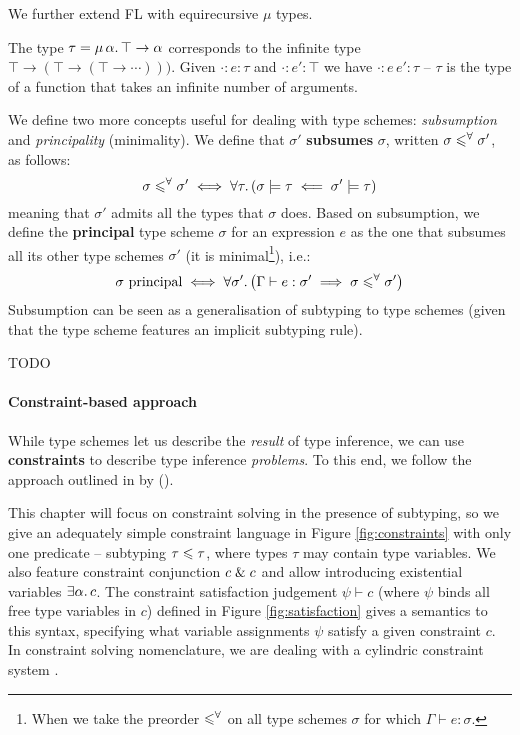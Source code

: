 \begin{example}
    We further extend FL with equirecursive $\mu$ types. 
    
    The type $\tau = \mu\,{\alpha}\ldotp \top \to \alpha$ corresponds to the infinite type $\top \to (\top \to (\top \to \cdots)))$. Given $\cdot : e : \tau$ and $\cdot : e' : \top$ we have $\cdot : e\,e' : \tau$ -- $\tau$ is the type of a function that takes an infinite number of arguments.
\end{example}

We define two more concepts useful for dealing with type schemes: \emph{subsumption} and \emph{principality} (minimality). We define that $\sigma'$ \textbf{subsumes} $\sigma$, written $\sigma \leqslant^\forall \sigma'$, as follows:
$$ \sigma \leqslant^\forall \sigma' \iff \forall \tau \ldotp (\sigma \models \tau \impliedby \sigma' \models \tau) $$
meaning that $\sigma'$ admits all the types that $\sigma$ does.
Based on subsumption, we define the \textbf{principal} type scheme $\sigma$ for an expression $e$ as the one that subsumes all its other type schemes $\sigma'$ (it is minimal\footnote{When we take the preorder $\leqslant^\forall$ on all type schemes $\sigma$ for which $\Gamma \vdash e : \sigma$.}), i.e.\@:
$$ \sigma\text{ principal} \iff \forall \sigma' \ldotp \left( \Gamma \vdash e : \sigma' \implies \sigma \subsume \sigma' \right) $$
Subsumption can be seen as a generalisation of subtyping to type schemes (given that the type scheme features an implicit subtyping rule). 

\begin{example}
    {\color{red} TODO} 
\end{example}

\paragraph{Constraint-based approach} While type schemes let us describe the \emph{result} of type inference, we can use \textbf{constraints} to describe type inference \emph{problems}. To this end, we follow the approach outlined in  by \textcite{essence-of-ml-type-inference} (\textcite[Chapter~10]{adv-tapl}).

This chapter will focus on constraint solving in the presence of subtyping, so we give an adequately simple constraint language in Figure \ref{fig:constraints} with only one predicate -- subtyping $\tau \leqslant \tau$, where types $\tau$ may contain type variables. We also feature constraint conjunction $c \;\&\; c$ and allow introducing existential variables $\exists \alpha \ldotp c$. The constraint satisfaction judgement $\psi \vdash c$ (where $\psi$ binds all free type variables in $c$) defined in Figure \ref{fig:satisfaction} gives a semantics to this syntax, specifying what variable assignments $\psi$ satisfy a given constraint $c$. In constraint solving nomenclature, we are dealing with a cylindric constraint system \cite{constraint-based-hm}. 

